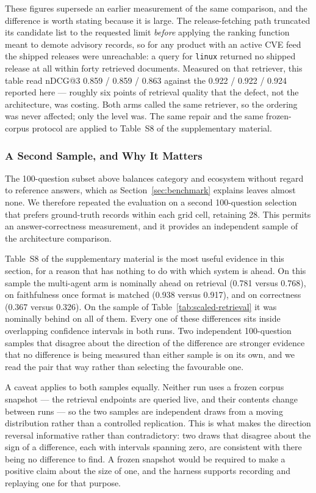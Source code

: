 \documentclass[acmsmall,review,anonymous,screen]{acmart}
\begin{document}
These figures supersede an earlier measurement of the same comparison, and the
difference is worth stating because it is large. The release-fetching path
truncated its candidate list to the requested limit \emph{before} applying the
ranking function meant to demote advisory records, so for any product with an
active CVE feed the shipped releases were unreachable: a query for
\texttt{linux} returned no shipped release at all within forty retrieved
documents. Measured on that retriever, this table read nDCG@3 0.859 / 0.859 /
0.863 against the 0.922 / 0.922 / 0.924 reported here --- roughly six points of
retrieval quality that the defect, not the architecture, was costing. Both arms
called the same retriever, so the ordering was never affected; only the level
was. The same repair and the same frozen-corpus protocol are applied to
Table~S8 of the supplementary material.

\subsubsection{A Second Sample, and Why It Matters}

The 100-question subset above balances category and ecosystem without regard to
reference answers, which as Section~\ref{sec:benchmark} explains leaves almost
none. We therefore repeated the evaluation on a second 100-question selection
that prefers ground-truth records within each grid cell, retaining 28. This
permits an answer-correctness measurement, and it provides an independent sample
of the architecture comparison.

Table~S8 of the supplementary material is the most useful evidence in this section, for a reason
that has nothing to do with which system is ahead. On this sample the
multi-agent arm is nominally ahead on retrieval (0.781 versus 0.768), on
faithfulness once format is matched (0.938 versus 0.917), and on correctness
(0.367 versus 0.326). On the sample of Table~\ref{tab:scaled-retrieval} it was
nominally behind on all of them. Every one of these differences sits inside
overlapping confidence intervals in both runs. Two independent 100-question
samples that disagree about the direction of the difference are stronger
evidence that no difference is being measured than either sample is on its own,
and we read the pair that way rather than selecting the favourable one.

A caveat applies to both samples equally. Neither run uses a frozen corpus
snapshot --- the retrieval endpoints are queried live, and their contents change
between runs --- so the two samples are independent draws from a moving
distribution rather than a controlled replication. This is what makes the
direction reversal informative rather than contradictory: two draws that
disagree about the sign of a difference, each with intervals spanning zero, are
consistent with there being no difference to find. A frozen snapshot would be
required to make a positive claim about the size of one, and the harness
supports recording and replaying one for that purpose.
\end{document}
